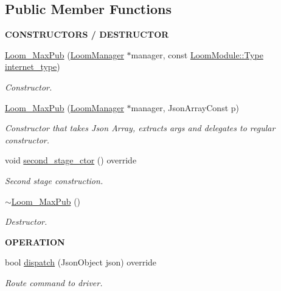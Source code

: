 \subsection*{Public Member Functions}
\begin{Indent}{\bf C\+O\+N\+S\+T\+R\+U\+C\+T\+O\+RS / D\+E\+S\+T\+R\+U\+C\+T\+OR}\par
\begin{DoxyCompactItemize}
\item 
\hyperlink{class_loom___max_pub_aa000de565cb6a5e06d03a6ff65f6f9e5}{Loom\+\_\+\+Max\+Pub} (\hyperlink{class_loom_manager}{Loom\+Manager} $\ast$manager, const \hyperlink{class_loom_module_aee91d0a75140d51ee428fc2d4417d865}{Loom\+Module\+::\+Type} \hyperlink{class_loom_publish_plat_aab697868e61843787893f5509d22b9ed}{internet\+\_\+type})
\begin{DoxyCompactList}\small\item\em Constructor. \end{DoxyCompactList}\item 
\hyperlink{class_loom___max_pub_a14324e11a518e6c64d92c0623d572765}{Loom\+\_\+\+Max\+Pub} (\hyperlink{class_loom_manager}{Loom\+Manager} $\ast$manager, Json\+Array\+Const p)
\begin{DoxyCompactList}\small\item\em Constructor that takes Json Array, extracts args and delegates to regular constructor. \end{DoxyCompactList}\item 
void \hyperlink{class_loom___max_pub_a86cecc2a45d660c5f1cc1d6b720b1739}{second\+\_\+stage\+\_\+ctor} () override
\begin{DoxyCompactList}\small\item\em Second stage construction. \end{DoxyCompactList}\item 
\hyperlink{class_loom___max_pub_a1cb4e999495f70425a920003dc78d99d}{$\sim$\+Loom\+\_\+\+Max\+Pub} ()
\begin{DoxyCompactList}\small\item\em Destructor. \end{DoxyCompactList}\end{DoxyCompactItemize}
\end{Indent}
\begin{Indent}{\bf O\+P\+E\+R\+A\+T\+I\+ON}\par
\begin{DoxyCompactItemize}
\item 
bool \hyperlink{class_loom___max_pub_a5d824f56b133288fc9dcb0d62379ca35}{dispatch} (Json\+Object json) override
\begin{DoxyCompactList}\small\item\em Route command to driver. \end{DoxyCompactList}\end{DoxyCompactItemize}
\end{Indent}
